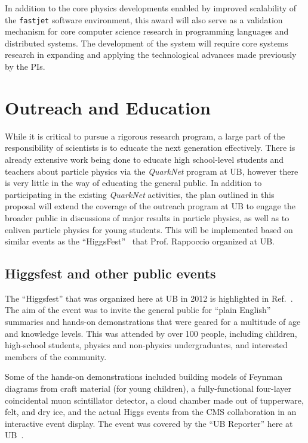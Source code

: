 \documentclass[times,11pt]{article}
\begin{document}
In addition to the core physics developments enabled by improved
scalability of the {\tt fastjet} software environment, this award will
also serve as a validation mechanism for core computer science
research in programming languages and distributed systems.  The development
of the system will require core systems research in expanding and applying
the technological advances made previously by the PIs.



\section{Outreach and Education}

While it is critical to pursue a rigorous research program, a large
part of the responsibility of scientists is to educate the next
generation effectively. There is already extensive work being done to
educate high school-level students and teachers about particle physics
via the {\em QuarkNet}
program  at UB, however there is
very little in the way of educating the general
public. 
In addition to participating in the existing {\em QuarkNet}
activities, the plan outlined in this proposal will extend the coverage of the
outreach program at UB to engage the broader
public in discussions of major results in particle
physics, as well as to enliven particle physics for young students. 
This will be implemented based on similar events as the
``HiggsFest''~\cite{higgsfest} that Prof. Rappoccio organized at UB. 


\subsection{Higgsfest and other public events}

The ``Higgsfest'' that was organized here at UB in 2012
is highlighted in Ref.~\cite{higgsfest}. The aim of the event was to
invite the general public for ``plain English'' summaries and hands-on
demonstrations that were geared for a multitude of age and knowledge
levels. 
This was attended by over 100 people, including children,
high-school students, physics and non-physics undergraduates, and
interested members of the community. 

Some of the hands-on demonstrations included building models of
Feynman diagrams from craft material (for young children), a
fully-functional four-layer coincidental muon scintillator detector,
a cloud chamber made out of tupperware, felt, and dry ice, and the
actual Higgs events from the CMS collaboration in an interactive event
display. 
The event was covered by the ``UB Reporter'' here at
UB~\cite{higgsfest_ubreporter}. 
\end{document}
